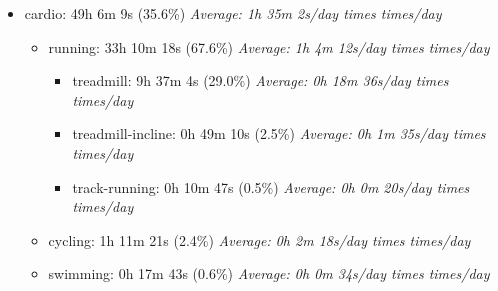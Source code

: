 \documentclass[12pt]{extarticle}
\begin{document}
\begin{itemize}[topsep=0pt, itemsep=-0.5ex]
\begin{itemize}[topsep=0pt, itemsep=-0.5ex]
\begin{itemize}[topsep=0pt, itemsep=-0.5ex]
        \textit{Average: 0h 9m 56s/day  times  times/day}\par
    \item dips: 4h 22m 56s (29.8\%)
        \textit{Average: 0h 8m 28s/day  times  times/day}\par
    \item bench-press: 3h 31m 24s (24.0\%)
        \textit{Average: 0h 6m 49s/day  times  times/day}\par
\end{itemize}
\end{itemize}
    \item cardio: 49h 6m 9s (35.6\%)
        \textit{Average: 1h 35m 2s/day  times  times/day}\par
\begin{itemize}[topsep=0pt, itemsep=-0.5ex]
    \item running: 33h 10m 18s (67.6\%)
        \textit{Average: 1h 4m 12s/day  times  times/day}\par
\begin{itemize}[topsep=0pt, itemsep=-0.5ex]
    \item treadmill: 9h 37m 4s (29.0\%)
        \textit{Average: 0h 18m 36s/day  times  times/day}\par
    \item treadmill-incline: 0h 49m 10s (2.5\%)
        \textit{Average: 0h 1m 35s/day  times  times/day}\par
    \item track-running: 0h 10m 47s (0.5\%)
        \textit{Average: 0h 0m 20s/day  times  times/day}\par
\end{itemize}
    \item cycling: 1h 11m 21s (2.4\%)
        \textit{Average: 0h 2m 18s/day  times  times/day}\par
    \item swimming: 0h 17m 43s (0.6\%)
        \textit{Average: 0h 0m 34s/day  times  times/day}\par
\end{itemize}

\end{itemize}
\end{document}

